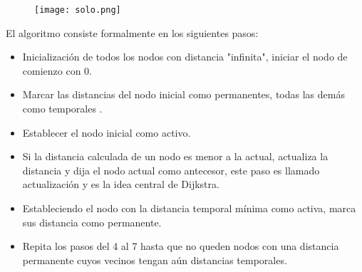 \documentclass[a4,papper]{IEEEtran}
\begin{document}
\begin{center}
\begin{figure}
    \centering
    \texttt{[image: solo.png]}
\end{figure}
\end{center}

El algoritmo consiste formalmente en los siguientes pasos:\\

\begin{itemize}
    \item Inicialización de todos los nodos con distancia "infinita", iniciar el nodo de comienzo con $0.$
    
    \item Marcar las distancias del nodo inicial como permanentes, todas las demás como temporales .
    
    \item Establecer el nodo inicial como activo.
    
    \item Si la distancia calculada de un nodo es menor a la actual, actualiza la distancia y dija el nodo actual como antecesor, este paso es llamado actualización y es la idea central de Dijkstra.
    
    \item Estableciendo el nodo con la distancia temporal mínima como activa, marca sus distancia como permanente.
    
    \item Repita los pasos del 4 al 7 hasta que no queden nodos con una distancia permanente cuyos vecinos tengan aún distancias temporales.
    
\end{itemize}





\IEEEPARstart{}
\end{document}
